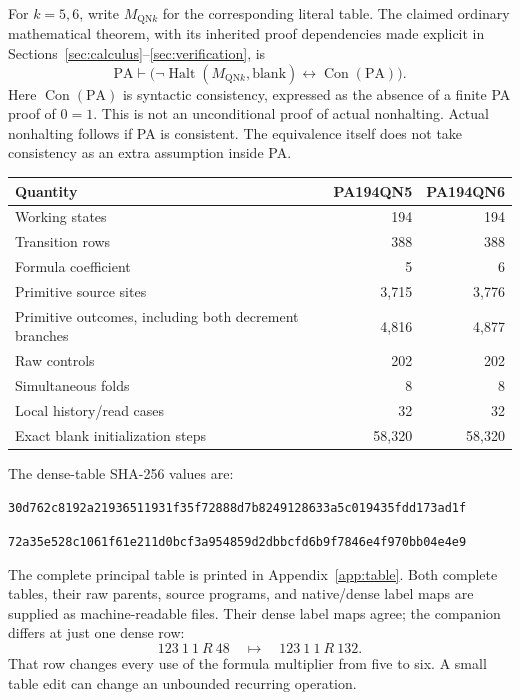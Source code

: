 \documentclass[11pt,letterpaper]{article}
\newcommand{\PA}{\mathrm{PA}}
\newcommand{\Con}{\operatorname{Con}}
\newcommand{\Halt}{\operatorname{Halt}}
\newcommand{\file}[1]{\begingroup\def\UrlBreaks{\do\/\do\_\do\-\do\.}\texttt{\nolinkurl{#1}}\endgroup}
\newcommand{\QN}[1]{M_{\mathrm{QN}#1}}
\begin{document}
For $k=5,6$, write $\QN{k}$ for the corresponding literal table. The claimed
ordinary mathematical theorem, with its inherited proof dependencies made explicit
in Sections~\ref{sec:calculus}--\ref{sec:verification}, is
\[
 \boxed{\quad \PA\vdash
   \bigl(\neg\Halt(\QN{k},\mathrm{blank})\leftrightarrow\Con(\PA)\bigr).
   \quad}
\]
Here $\Con(\PA)$ is syntactic consistency, expressed as the absence of a finite
PA proof of $0=1$. This is not an unconditional proof of actual nonhalting.
Actual nonhalting follows if PA is consistent. The equivalence itself does not
take consistency as an extra assumption inside PA.

\begin{center}
\begin{tabular}{@{}lrr@{}}
\toprule
Quantity & PA194QN5 & PA194QN6\\
\midrule
Working states &194&194\\
Transition rows &388&388\\
Formula coefficient &5&6\\
Primitive source sites &3,715&3,776\\
Primitive outcomes, including both decrement branches &4,816&4,877\\
Raw controls &202&202\\
Simultaneous folds &8&8\\
Local history/read cases &32&32\\
Exact blank initialization steps &58,320&58,320\\
\bottomrule
\end{tabular}
\end{center}

The dense-table SHA-256 values are:
\begin{description}[style=nextline]
\item[PA194QN5] \file{30d762c8192a21936511931f35f72888d7b8249128633a5c019435fdd173ad1f}
\item[PA194QN6] \file{72a35e528c1061f61e211d0bcf3a954859d2dbbcfd6b9f7846e4f970bb04e4e9}
\end{description}
The complete principal table is printed in Appendix~\ref{app:table}. Both
complete tables, their raw parents, source programs, and native/dense label
maps are supplied as machine-readable files. Their dense label maps agree;
the companion differs at just one dense row:
\[
 123\ 1\ 1\ R\ 48 \quad\longmapsto\quad 123\ 1\ 1\ R\ 132.
\]
That row changes every use of the formula multiplier from five to six. A small
table edit can change an unbounded recurring operation.
\end{document}
